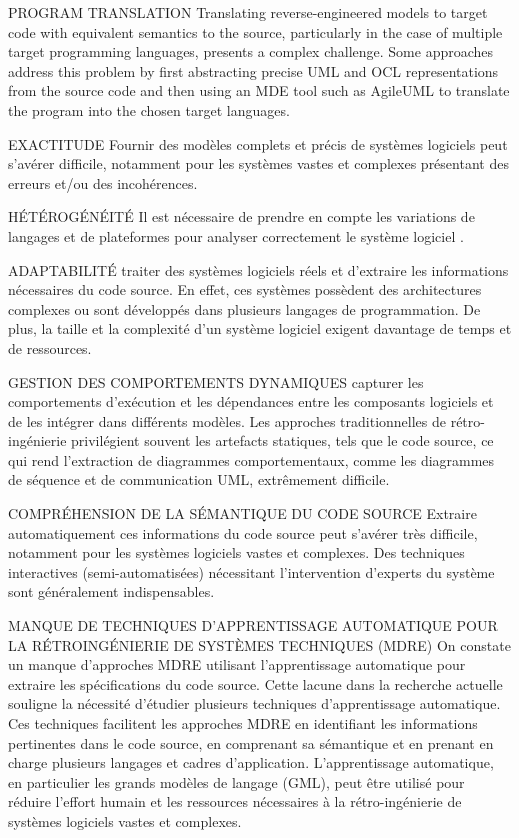 {{\item [g:] PROGRAM TRANSLATION Translating reverse-engineered models to target code with equivalent semantics to the source, particularly in the case of multiple target programming languages, presents a complex challenge. Some approaches address this problem by first abstracting precise UML and OCL representations from the source code and then using an MDE tool such as AgileUML to translate the program into the chosen target languages.
}{
\item [a:] EXACTITUDE \elide Fournir des modèles complets et précis de systèmes logiciels peut s'avérer difficile, notamment pour les systèmes vastes et complexes présentant des erreurs et/ou des incohérences.
\item [b:] HÉTÉROGÉNÉITÉ \elide Il est nécessaire de prendre en compte les variations de langages et de plateformes pour analyser correctement le système logiciel \elide.
\item [c:] ADAPTABILITÉ \elide traiter des systèmes logiciels réels et d'extraire les informations nécessaires du code source. En effet, ces systèmes possèdent des architectures complexes ou sont développés dans plusieurs langages de programmation. De plus, la taille et la complexité d'un système logiciel exigent davantage de temps et de ressources.
\item [d:] GESTION DES COMPORTEMENTS DYNAMIQUES \elide capturer les comportements d'exécution et les dépendances entre les composants logiciels et de les intégrer dans différents modèles. Les approches traditionnelles de rétro-ingénierie privilégient souvent les artefacts statiques, tels que le code source, ce qui rend l'extraction de diagrammes comportementaux, comme les diagrammes de séquence et de communication UML, extrêmement difficile.
\item [e:] COMPRÉHENSION DE LA SÉMANTIQUE DU CODE SOURCE \elide Extraire automatiquement ces informations du code source peut s'avérer très difficile, notamment pour les systèmes logiciels vastes et complexes. Des techniques interactives (semi-automatisées) nécessitant l'intervention d'experts du système sont généralement indispensables.
\item [f:] MANQUE DE TECHNIQUES D'APPRENTISSAGE AUTOMATIQUE POUR LA RÉTROINGÉNIERIE DE SYSTÈMES TECHNIQUES (MDRE) On constate un manque d'approches MDRE utilisant l'apprentissage automatique pour extraire les spécifications du code source. Cette lacune dans la recherche actuelle souligne la nécessité d'étudier plusieurs techniques d'apprentissage automatique. Ces techniques facilitent les approches MDRE en identifiant les informations pertinentes dans le code source, en comprenant sa sémantique et en prenant en charge plusieurs langages et cadres d'application. L'apprentissage automatique, en particulier les grands modèles de langage (GML), peut être utilisé pour réduire l'effort humain et les ressources nécessaires à la rétro-ingénierie de systèmes logiciels vastes et complexes.
}}
